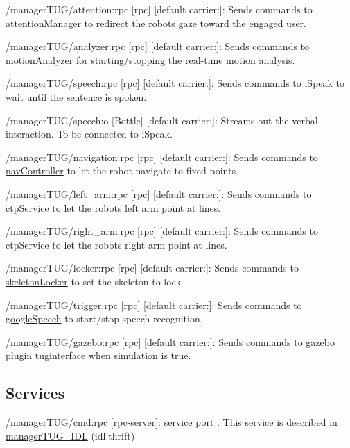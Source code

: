 \begin{DoxyItemize}
\item /manager\+T\+U\+G/attention\+:rpc \mbox{[}rpc\mbox{]} \mbox{[}default carrier\+:\mbox{]}\+: Sends commands to \hyperlink{group__attentionManager}{attention\+Manager} to redirect the robot\textquotesingle{}s gaze toward the engaged user.
\item /manager\+T\+U\+G/analyzer\+:rpc \mbox{[}rpc\mbox{]} \mbox{[}default carrier\+:\mbox{]}\+: Sends commands to \hyperlink{group__motionAnalyzer}{motion\+Analyzer} for starting/stopping the real-\/time motion analysis.
\item /manager\+T\+U\+G/speech\+:rpc \mbox{[}rpc\mbox{]} \mbox{[}default carrier\+:\mbox{]}\+: Sends commands to i\+Speak to wait until the sentence is spoken.
\item /manager\+T\+U\+G/speech\+:o \mbox{[}Bottle\mbox{]} \mbox{[}default carrier\+:\mbox{]}\+: Streams out the verbal interaction. To be connected to i\+Speak.
\item /manager\+T\+U\+G/navigation\+:rpc \mbox{[}rpc\mbox{]} \mbox{[}default carrier\+:\mbox{]}\+: Sends commands to \hyperlink{group__navController}{nav\+Controller} to let the robot navigate to fixed points.
\item /manager\+T\+U\+G/left\+\_\+arm\+:rpc \mbox{[}rpc\mbox{]} \mbox{[}default carrier\+:\mbox{]}\+: Sends commands to ctp\+Service to let the robot\textquotesingle{}s left arm point at lines.
\item /manager\+T\+U\+G/right\+\_\+arm\+:rpc \mbox{[}rpc\mbox{]} \mbox{[}default carrier\+:\mbox{]}\+: Sends commands to ctp\+Service to let the robot\textquotesingle{}s right arm point at lines.
\item /manager\+T\+U\+G/locker\+:rpc \mbox{[}rpc\mbox{]} \mbox{[}default carrier\+:\mbox{]}\+: Sends commands to \hyperlink{group__skeletonLocker}{skeleton\+Locker} to set the skeleton to lock.
\item /manager\+T\+U\+G/trigger\+:rpc \mbox{[}rpc\mbox{]} \mbox{[}default carrier\+:\mbox{]}\+: Sends commands to \hyperlink{group__googleSpeech}{google\+Speech} to start/stop speech recognition.
\item /manager\+T\+U\+G/gazebo\+:rpc \mbox{[}rpc\mbox{]} \mbox{[}default carrier\+:\mbox{]}\+: Sends commands to gazebo plugin tuginterface when simulation is true.
\end{DoxyItemize}\hypertarget{group__skeletonViewer_services_sec}{}\subsection{Services}\label{group__skeletonViewer_services_sec}

\begin{DoxyItemize}
\item /manager\+T\+U\+G/cmd\+:rpc \mbox{[}rpc-\/server\mbox{]}\+: service port . This service is described in \hyperlink{classmanagerTUG__IDL}{manager\+T\+U\+G\+\_\+\+I\+DL} (idl.\+thrift) 
\end{DoxyItemize}